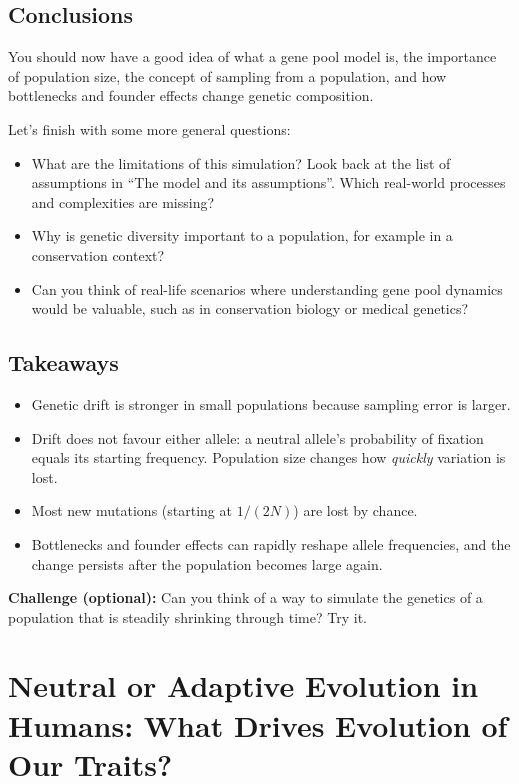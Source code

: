 \documentclass[
  a4paper]{book}
\providecommand{\tightlist}{%
  \setlength{\itemsep}{0pt}\setlength{\parskip}{0pt}}
\begin{document}
\section{Conclusions}\label{conclusions}

You should now have a good idea of what a gene pool model is, the importance of population size, the concept of sampling from a population, and how bottlenecks and founder effects change genetic composition.

Let's finish with some more general questions:

\begin{itemize}
\tightlist
\item
  What are the limitations of this simulation? Look back at the list of assumptions in ``The model and its assumptions''. Which real-world processes and complexities are missing?
\item
  Why is genetic diversity important to a population, for example in a conservation context?
\item
  Can you think of real-life scenarios where understanding gene pool dynamics would be valuable, such as in conservation biology or medical genetics?
\end{itemize}

\section{Takeaways}\label{takeaways-15}

\begin{itemize}
\tightlist
\item
  Genetic drift is stronger in small populations because sampling error is larger.
\item
  Drift does not favour either allele: a neutral allele's probability of fixation equals its starting frequency. Population size changes how \emph{quickly} variation is lost.
\item
  Most new mutations (starting at \(1/(2N)\)) are lost by chance.
\item
  Bottlenecks and founder effects can rapidly reshape allele frequencies, and the change persists after the population becomes large again.
\end{itemize}

\textbf{Challenge (optional):} Can you think of a way to simulate the genetics of a population that is steadily shrinking through time? Try it.

\chapter{Neutral or Adaptive Evolution in Humans: What Drives Evolution of Our Traits?}\label{neutral-or-adaptive-evolution-in-humans-what-drives-evolution-of-our-traits}
\end{document}
